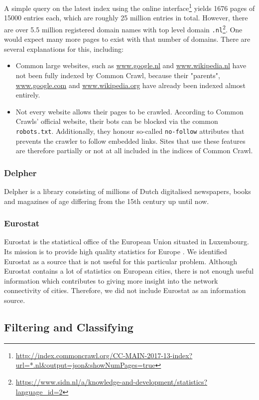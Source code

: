 A simple query on the latest index using the online interface\footnote{\url{http://index.commoncrawl.org/CC-MAIN-2017-13-index?url=*.nl&output=json&showNumPages=true}} yields 1676 pages of 15000 entries each, which are roughly 25 million entries in total. However, there are over 5.5 million registered domain names with top level domain \texttt{.nl}\footnote{\url{https://www.sidn.nl/a/knowledge-and-development/statistics?language_id=2}}. One would expect many more pages to exist with that number of domains. There are several explanations for this, including:
\begin{itemize}
\item Common large websites, such as \url{www.google.nl} and \url{www.wikipedia.nl} have not been fully indexed by Common Crawl, because their "parents", \url{www.google.com} and \url{www.wikipedia.org} have already been indexed almost entirely.
\item Not every website allows their pages to be crawled. According to Common Crawls' official website, their bots can be blocked via the common \texttt{robots.txt}. Additionally, they honour so-called \texttt{no-follow} attributes that prevents the crawler to follow embedded links. Sites that use these features are therefore partially or not at all included in the indices of Common Crawl.
\end{itemize}

\subsubsection{Delpher}
Delpher\cite{delpher} is a library consisting of millions of Dutch digitalised newspapers, books and magazines of age differing from the 15th century up until now.

\subsubsection{Eurostat}
Eurostat is the statistical office of the European Union situated in Luxembourg. Its mission is to provide high quality statistics for Europe \cite{Eurostat}. We identified Eurostat as a source that is not useful for this particular problem. Although Eurostat contains a lot of statistics on European cities, there is not enough useful information which contributes to giving more insight into the network connectivity of cities. Therefore, we did not include Eurostat as an information source.

\subsection{Filtering and Classifying}

